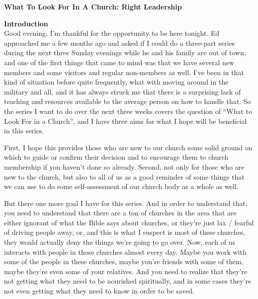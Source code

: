 \documentclass[letterpaper, 12pt]{article}
\begin{document}
    \thispagestyle{empty}

    \begin{center}

        \textbf{\large{What To Look For In A Church: Right Leadership}}

    \end{center}

    \noindent \textbf{Introduction} \\

    Good evening, I'm thankful for the opportunity to be here tonight.
    Ed approached me a few months ago and asked if I could do a
    three-part series during the next three Sunday evenings while he and
    his family are out of town, and one of the first things that came to
    mind was that we have several new members and some visitors and
    regular non-members as well. I've been in that kind of situation
    before quite frequently, what with moving around in the military and
    all, and it has always struck me that there is a surprising lack of
    teaching and resources available to the average person on how to
    handle that. So the series I want to do over the next three weeks
    covers the question of ``What to Look For in a Church'', and I have
    three aims for what I hope will be beneficial in this series. 

    First, I hope this provides those who are new to our church some
    solid ground on which to guide or confirm their decision and to
    encourage them to church membership if you haven't done so already.
    Second, not only for those who are new to the church, but also to
    all of us as a good reminder of some things that we can use to do
    some self-assessment of our church body as a whole as well. 

    But there one more goal I have for this series. And in order to
    understand that, you need to understand that there are a ton of
    churches in the area that are either ignorant of what the Bible says
    about churches, or they're just lax / fearful of driving people
    away, or, and this is what I suspect is most of these churches, they
    would actually deny the things we're going to go over. Now, each of
    us interacts with people in those churches almost every day. Maybe
    you work with some of the people in these churches, maybe you're
    friends with some of them, maybe they're even some of your
    relatives. And you need to realize that they're not getting what
    they need to be nourished spiritually, and in some cases they're not
    even getting what they need to know in order to be saved.
\end{document}
